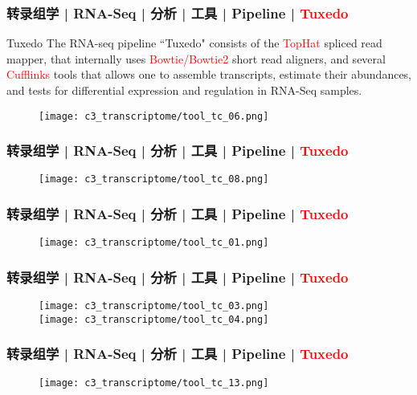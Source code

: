 \begin{frame}
  \frametitle{转录组学 | RNA-Seq | 分析 | 工具 | Pipeline | \textcolor{red}{Tuxedo}}
  {\footnotesize
  \begin{block}{Tuxedo}
    The RNA-seq pipeline ``Tuxedo" consists of the \textcolor{red}{TopHat} spliced read mapper, that internally uses \textcolor{red}{Bowtie/Bowtie2} short read aligners, and several \textcolor{red}{Cufflinks} tools that allows one to assemble transcripts, estimate their abundances, and tests for differential expression and regulation in RNA-Seq samples.
  \end{block}
}
  \begin{figure}
    \centering
    \texttt{[image: c3\_transcriptome/tool\_tc\_06.png]}
  \end{figure}
\end{frame}

\begin{frame}
  \frametitle{转录组学 | RNA-Seq | 分析 | 工具 | Pipeline | \textcolor{red}{Tuxedo}}
  \begin{figure}
    \centering
    \texttt{[image: c3\_transcriptome/tool\_tc\_08.png]}
  \end{figure}
\end{frame}

\begin{frame}
  \frametitle{转录组学 | RNA-Seq | 分析 | 工具 | Pipeline | \textcolor{red}{Tuxedo}}
  \begin{figure}
    \centering
    \texttt{[image: c3\_transcriptome/tool\_tc\_01.png]}
  \end{figure}
\end{frame}

\begin{frame}
  \frametitle{转录组学 | RNA-Seq | 分析 | 工具 | Pipeline | \textcolor{red}{Tuxedo}}
  \begin{figure}
    \centering
    \texttt{[image: c3\_transcriptome/tool\_tc\_03.png]}\\
    \vspace{0.5em}
    \texttt{[image: c3\_transcriptome/tool\_tc\_04.png]}
  \end{figure}
\end{frame}

\begin{frame}
  \frametitle{转录组学 | RNA-Seq | 分析 | 工具 | Pipeline | \textcolor{red}{Tuxedo}}
  \begin{figure}
    \centering
    \texttt{[image: c3\_transcriptome/tool\_tc\_13.png]}
  \end{figure}
\end{frame}

